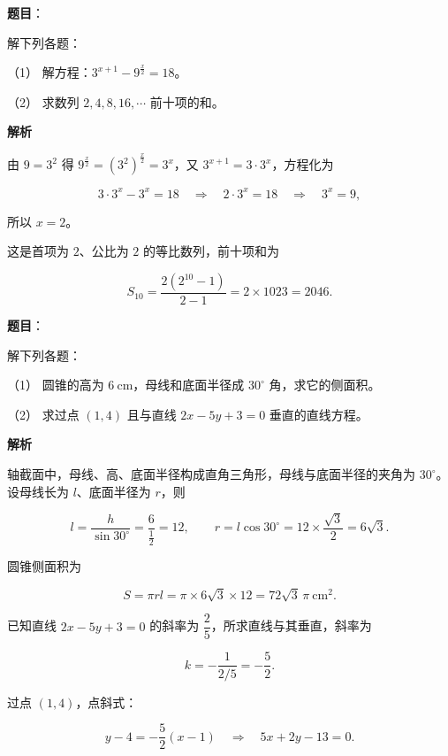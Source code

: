 \begin{answer}

\textbf{题目}：

解下列各题：

（1） 解方程：$3^{x+1}-9^{\frac{x}{2}}=18$。

（2） 求数列 $2,4,8,16,\cdots$ 前十项的和。

\textbf{解析}


由 $9=3^2$ 得 $9^{\frac{x}{2}}=(3^2)^{\frac{x}{2}}=3^x$，又 $3^{x+1}=3\cdot3^x$，方程化为

\nopagebreak[4]
\[
3\cdot3^x-3^x=18
\quad\Longrightarrow\quad
2\cdot3^x=18
\quad\Longrightarrow\quad
3^x=9,
\]

所以 $x=2$。


这是首项为 $2$、公比为 $2$ 的等比数列，前十项和为

\nopagebreak[4]
\[
S_{10}=\frac{2(2^{10}-1)}{2-1}=2\times1023=2046.
\]



\end{answer}
\begin{answer}

\textbf{题目}：

解下列各题：

（1） 圆锥的高为 $6\ \mathrm{cm}$，母线和底面半径成 $30^\circ$ 角，求它的侧面积。

（2） 求过点 $(1,4)$ 且与直线 $2x-5y+3=0$ 垂直的直线方程。

\textbf{解析}


轴截面中，母线、高、底面半径构成直角三角形，母线与底面半径的夹角为 $30^\circ$。设母线长为 $l$、底面半径为 $r$，则

\nopagebreak[4]
\[
l=\frac{h}{\sin30^\circ}=\frac{6}{\frac12}=12,
\qquad
r=l\cos30^\circ=12\times\frac{\sqrt3}{2}=6\sqrt3.
\]

圆锥侧面积为

\nopagebreak[4]
\[
S=\pi r l=\pi\times6\sqrt3\times12=72\sqrt3\,\pi\ \mathrm{cm^2}.
\]


已知直线 $2x-5y+3=0$ 的斜率为 $\dfrac25$，所求直线与其垂直，斜率为

\nopagebreak[4]
\[
k=-\frac{1}{2/5}=-\frac52.
\]

过点 $(1,4)$，点斜式：

\nopagebreak[4]
\[
y-4=-\frac52(x-1)
\quad\Longrightarrow\quad
5x+2y-13=0.
\]



\end{answer}
